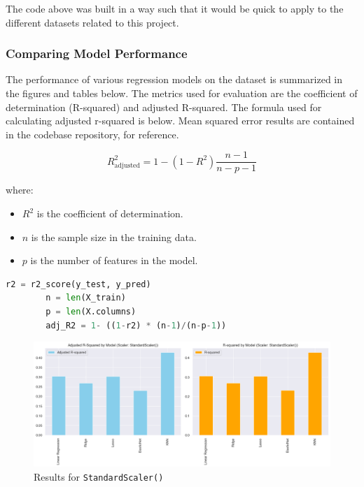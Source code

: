 \documentclass{article}
\theoremstyle{mytheoremstyle}
\theoremstyle{mytheoremstyle}
\theoremstyle{myproblemstyle}
\begin{document}
The code above was built in a way such that it would be quick to apply to the different datasets related to this project. 


\subsubsection{Comparing Model Performance}

The performance of various regression models on the dataset is summarized in the figures and tables below. The metrics used for evaluation are the coefficient of determination (R-squared) and adjusted R-squared. The formula used for calculating adjusted r-squared is below. Mean squared error results are contained in the codebase repository, for reference. 



    \[
R_{\text{adjusted}}^2 = 1 - (1 - R^2) \frac{n - 1}{n - p - 1}\]

where:
\begin{itemize}
    \item $R^2$ is the coefficient of determination.
    \item $n$ is the sample size in the training data.
    \item $p$ is the number of features in the model.
\end{itemize}

\begin{lstlisting}[language=Python, caption=R-squared computation within evaluation function]
        r2 = r2_score(y_test, y_pred)
        n = len(X_train)
        p = len(X.columns)
        adj_R2 = 1- ((1-r2) * (n-1)/(n-p-1))
\end{lstlisting}


\begin{figure}[htbp]
\centering
\includegraphics[width=\linewidth]{./Images/evalRegModelStandardScaler.png}
\caption{Results for \texttt{StandardScaler()}}
\label{fig:Standard Scaler Results}
\end{figure}
\end{document}
